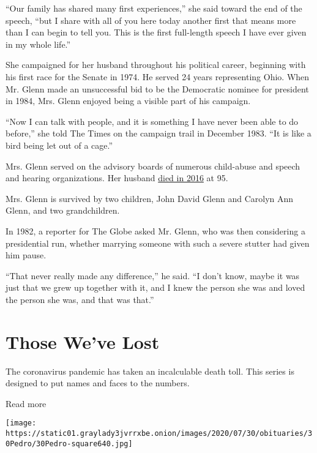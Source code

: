 ``Our family has shared many first experiences,'' she said toward the
end of the speech, ``but I share with all of you here today another
first that means more than I can begin to tell you. This is the first
full-length speech I have ever given in my whole life.''

She campaigned for her husband throughout his political career,
beginning with his first race for the Senate in 1974. He served 24 years
representing Ohio. When Mr. Glenn made an unsuccessful bid to be the
Democratic nominee for president in 1984, Mrs. Glenn enjoyed being a
visible part of his campaign.

``Now I can talk with people, and it is something I have never been able
to do before,'' she told The Times on the campaign trail in December
1983. ``It is like a bird being let out of a cage.''

Mrs. Glenn served on the advisory boards of numerous child-abuse and
speech and hearing organizations. Her husband
\href{https://www.nytimes3xbfgragh.onion/2016/12/08/us/john-glenn-dies.html}{died
in 2016} at 95.

Mrs. Glenn is survived by two children, John David Glenn and Carolyn Ann
Glenn, and two grandchildren.

In 1982, a reporter for The Globe asked Mr. Glenn, who was then
considering a presidential run, whether marrying someone with such a
severe stutter had given him pause.

``That never really made any difference,'' he said. ``I don't know,
maybe it was just that we grew up together with it, and I knew the
person she was and loved the person she was, and that was that.''

\href{https://www.nytimes3xbfgragh.onion/interactive/2020/obituaries/people-died-coronavirus-obituaries.html?action=click\&pgtype=Article\&state=default\&region=BELOW_MAIN_CONTENT\&context=covid_obits_promo}{}

\hypertarget{those-weve-lost}{%
\section{Those We've Lost}\label{those-weve-lost}}

The coronavirus pandemic has taken an incalculable death toll. This
series is designed to put names and faces to the numbers.

Read more

\texttt{[image: https://static01.graylady3jvrrxbe.onion/images/2020/07/30/obituaries/30Pedro/30Pedro-square640.jpg]}

